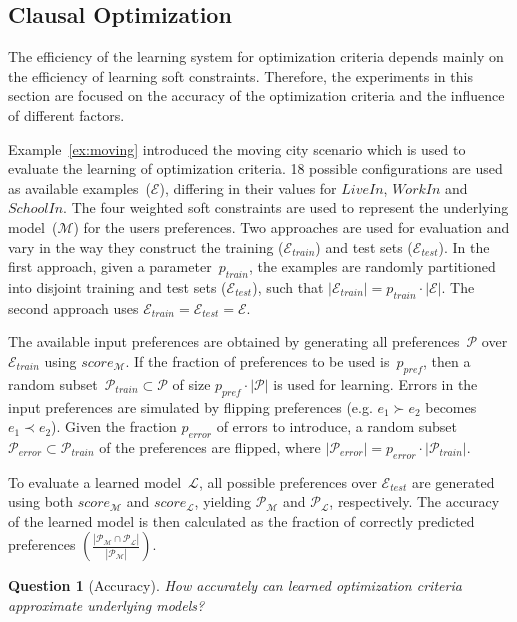 \documentclass[letterpaper]{article}
\newcommand{\sym}[1]{\ensuremath{\mathcal{#1}}}
\newtheorem{question}{Question}
\theoremstyle{definition}
\newcommand{\abs}[1]{\left|#1\right|}
\begin{document}
\subsection{Clausal Optimization}
The efficiency of the learning system for optimization criteria depends mainly on the efficiency of learning soft constraints.
Therefore, the experiments in this section are focused on the accuracy of the optimization criteria and the influence of different factors.

Example~\ref{ex:moving} introduced the moving city scenario which is used to evaluate the learning of optimization criteria.
18 possible configurations are used as available examples~(\sym{E}), differing in their values for $\mathit{LiveIn}$, $\mathit{WorkIn}$ and $\mathit{SchoolIn}$.
The four weighted soft constraints are used to represent the underlying model~(\sym{M}) for the users preferences.
Two approaches are used for evaluation and vary in the way they construct the training ($\sym{E}_{train}$) and test sets ($\sym{E}_{test}$).
In the first approach, given a parameter~$p_{train}$, the examples are randomly partitioned into disjoint training and test sets ($\sym{E}_{test}$), such that $\abs{\sym{E}_{train}} = p_{train} \cdot \abs{\sym{E}}$.
The second approach uses $\sym{E}_{train} = \sym{E}_{test} = \sym{E}$.

The available input preferences are obtained by generating all preferences~$\sym{P}$ over $\sym{E}_{train}$ using $score_{\sym{M}}$.
If the fraction of preferences to be used is~$p_{pref}$, then a random subset~$\sym{P}_{train} \subset \sym{P}$ of size $p_{pref} \cdot \abs{\sym{P}}$ is used for learning.
Errors in the input preferences are simulated by flipping preferences (e.g. $e_1 \succ e_2$ becomes $e_1 \prec e_2$).
Given the fraction $p_{error}$ of errors to introduce, a random subset $\sym{P}_{error} \subset \sym{P}_{train}$ of the preferences are flipped, where $\abs{\sym{P}_{error}} = p_{error} \cdot \abs{\sym{P}_{train}}$.

To evaluate a learned model~$\sym{L}$, all possible preferences over $\sym{E}_{test}$ are generated using both $score_{\sym{M}}$ and $score_{\sym{L}}$, yielding $\sym{P}_\sym{M}$ and $\sym{P}_\sym{L}$, respectively.
The accuracy of the learned model is then calculated as the fraction of correctly predicted preferences $(\frac{\abs{\sym{P}_\sym{M} \cap \sym{P}_\sym{L}}}{\abs{\sym{P}_\sym{M}}})$.

\begin{question}[Accuracy]
  How accurately can learned optimization criteria approximate underlying models?
\end{question}
\end{document}
